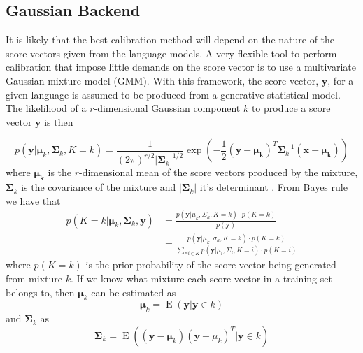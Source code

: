 \subsection{Gaussian Backend}

It is likely that the best calibration method will depend on the nature of the score-vectors given from the language models. A very flexible tool to perform calibration that impose little demands on the score vector is to use a multivariate Gaussian mixture model (GMM). With this framework, the score vector, $\mathbf{y}$, for a given language is assumed to be produced from a generative statistical model. The likelihood of a $r$-dimensional Gaussian component $k$ to produce a score vector $\mathbf{y}$ is then

\begin{equation}
\label{gmmeq}
p(\mathbf{y} | \mathbf{\mu}_k, \mathbf{\Sigma}_k, K = k) = \frac{1}{(2\pi)^{r/2}|\mathbf{\Sigma}_k|^{1/2}}\exp(-\frac{1}{2}(\mathbf{y}-\mathbf{\mu_k})^T\mathbf{\Sigma}_k^{-1}(\mathbf{x}-\mathbf{\mu_k}))
\end{equation}
where $\mathbf{\mu_k}$ is the $r$-dimensional mean of the score vectors produced by the mixture, $\mathbf{\Sigma}_k$ is the covariance of the mixture and $|\mathbf{\Sigma}_k|$ it's determinant \cite[p. 94]{talegk}. From Bayes rule we have that
\begin{align}
p(K=k | \mathbf{\mu}_k, \mathbf{\Sigma}_k, \mathbf{y}) &= 
\frac{p(\mathbf{y} | \mu_k, \Sigma_k, K= k) \cdot p(K=k )}{p(\mathbf{y})} \nonumber \\
&= \frac{p(\mathbf{y} | \mu_k, \sigma_k, K=k) \cdot p(K=k)}{\sum_{\forall i \in K} p(\mathbf{y} | \mu_i, \Sigma_i, K=i) \cdot p(K=i)} \label{gmmchoose}
\end{align}
where $p(K=k)$ is the prior probability of the score vector being generated from mixture $k$. If we know what mixture each score vector in a training set belongs to, then $\mathbf{\mu}_k$ can be estimated as
\begin{equation}
\label{muest}
\mathbf{\mu}_k = \operatorname{E}(\mathbf{y} | \mathbf{y} \in k)
\end{equation}
and $\mathbf{\Sigma}_k$ as
\begin{equation}
\label{sigmaest}
\mathbf{\Sigma}_k = \operatorname{E}\left( (\mathbf{y}-\mathbf{\mu}_k)(\mathbf{y}-\mu_k)^T | \mathbf{y} \in k \right)
\end{equation}
